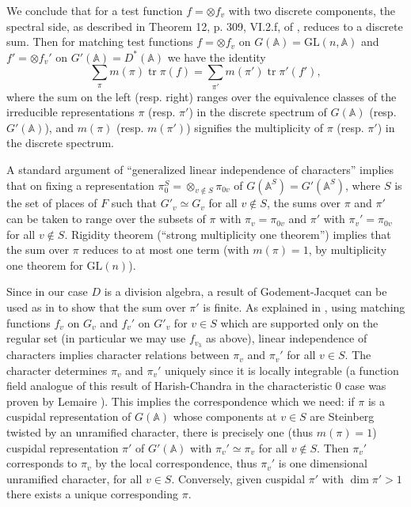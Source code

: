 \documentclass[11pt,a4paper]{article}
\theoremstyle{plain}
\theoremstyle{definition}
\DeclareMathOperator{\tr}{tr}
\newcommand{\GL}{\mathrm{GL}}
\begin{document}
We conclude that for a test function $f = \otimes f_v$ with two discrete components, the spectral side, as described in Theorem 12, p. 309, VI.2.f, of \cite{Laf}, reduces to a discrete sum. Then for matching test functions $f = \otimes f_v$ on $G(\mathbb{A}) = \GL(n, \mathbb{A})$ and $f' = \otimes f_v'$ on $G'(\mathbb{A}) = D^*(\mathbb{A})$ we have the identity
\[
\sum_\pi m(\pi) \tr \pi(f) = \sum_{\pi'} m(\pi') \tr \pi'(f'),
\]
where the sum on the left (resp. right) ranges over the equivalence classes of the irreducible representations $\pi$ (resp. $\pi'$) in the discrete spectrum of $G(\mathbb{A})$ (resp. $G'(\mathbb{A})$), and $m(\pi)$ (resp. $m(\pi')$) signifies the multiplicity of $\pi$ (resp. $\pi'$) in the discrete spectrum.

A standard argument of ``generalized linear independence of characters'' implies that on fixing a representation $\pi_0^S = \otimes_{v \notin S} \pi_{0v}$ of $G(\mathbb{A}^S) = G'(\mathbb{A}^S)$, where $S$ is the set of places of $F$ such that $G'_v \simeq G_v$ for all $v \notin S$, the sums over $\pi$ and $\pi'$ can be taken to range over the subsets of $\pi$ with $\pi_v = \pi_{0v}$ and $\pi'$ with $\pi_v' = \pi_{0v}$ for all $v \notin S$. Rigidity theorem (``strong multiplicity one theorem'') implies that the sum over $\pi$ reduces to at most one term (with $m(\pi) = 1$, by multiplicity one theorem for $\GL(n)$).

Since in our case $D$ is a division algebra, a result of Godement-Jacquet can be used as in \cite{F2} to show that the sum over $\pi'$ is finite. As explained in \cite{F2}, using matching functions $f_v$ on $G_v$ and $f_v'$ on $G'_v$ for $v \in S$ which are supported only on the regular set (in particular we may use $f_{v_3}$ as above), linear independence of characters implies character relations between $\pi_v$ and $\pi_v'$ for all $v \in S$. The character determines $\pi_v$ and $\pi_v'$ uniquely since it is locally integrable (a function field analogue of this result of Harish-Chandra in the characteristic $0$ case was proven by Lemaire \cite{Le}). This implies the correspondence which we need: if $\pi$ is a cuspidal representation of $G(\mathbb{A})$ whose components at $v \in S$ are Steinberg twisted by an unramified character, there is precisely one (thus $m(\pi) = 1$) cuspidal representation $\pi'$ of $G'(\mathbb{A})$ with $\pi_v' \simeq \pi_v$ for all $v \notin S$. Then $\pi_v'$ corresponds to $\pi_v$ by the local correspondence, thus $\pi_v'$ is one dimensional unramified character, for all $v \in S$. Conversely, given cuspidal $\pi'$ with $\dim \pi' > 1$ there exists a unique corresponding $\pi$.
\end{document}
